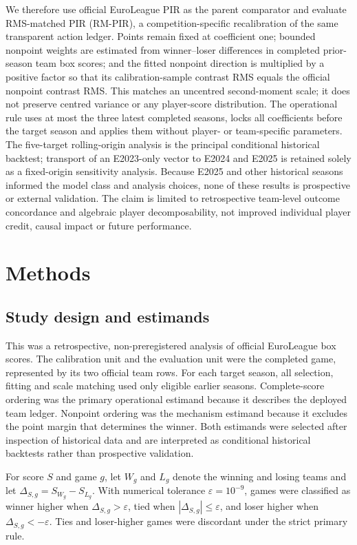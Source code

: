 \documentclass[pdflatex,sn-mathphys-num]{sn-jnl}
\begin{document}
We therefore use official EuroLeague PIR as the parent comparator and evaluate RMS-matched PIR (RM-PIR), a competition-specific recalibration of the same transparent action ledger. Points remain fixed at coefficient one; bounded nonpoint weights are estimated from winner--loser differences in completed prior-season team box scores; and the fitted nonpoint direction is multiplied by a positive factor so that its calibration-sample contrast RMS equals the official nonpoint contrast RMS. This matches an uncentred second-moment scale; it does not preserve centred variance or any player-score distribution. The operational rule uses at most the three latest completed seasons, locks all coefficients before the target season and applies them without player- or team-specific parameters. The five-target rolling-origin analysis is the principal conditional historical backtest; transport of an E2023-only vector to E2024 and E2025 is retained solely as a fixed-origin sensitivity analysis. Because E2025 and other historical seasons informed the model class and analysis choices, none of these results is prospective or external validation. The claim is limited to retrospective team-level outcome concordance and algebraic player decomposability, not improved individual player credit, causal impact or future performance.

\section{Methods}

\subsection{Study design and estimands}

This was a retrospective, non-preregistered analysis of official EuroLeague box scores. The calibration unit and the evaluation unit were the completed game, represented by its two official team rows. For each target season, all selection, fitting and scale matching used only eligible earlier seasons. Complete-score ordering was the primary operational estimand because it describes the deployed team ledger. Nonpoint ordering was the mechanism estimand because it excludes the point margin that determines the winner. Both estimands were selected after inspection of historical data and are interpreted as conditional historical backtests rather than prospective validation.

For score \(S\) and game \(g\), let \(W_g\) and \(L_g\) denote the winning and losing teams and let \(\Delta_{S,g}=S_{W_g}-S_{L_g}\). With numerical tolerance \(\varepsilon=10^{-9}\), games were classified as winner higher when \(\Delta_{S,g}>\varepsilon\), tied when \(|\Delta_{S,g}|\leq\varepsilon\), and loser higher when \(\Delta_{S,g}<-\varepsilon\). Ties and loser-higher games were discordant under the strict primary rule.
\end{document}
